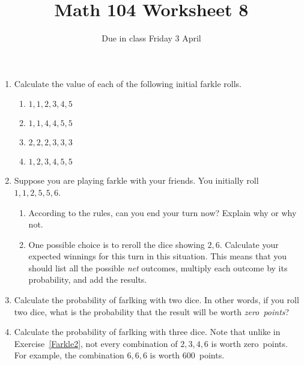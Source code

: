 \documentclass[12pt]{article}
\author{}\date{Due in class Friday 3 April}
\title{Math 104 Worksheet 8}\author{}
\begin{document}
\maketitle
\thispagestyle{empty}
\begin{enumerate}
\item Calculate the value of each of the following
initial farkle rolls.
\begin{enumerate}
\item $1,1,2,3,4,5$
\item $1,1,4,4,5,5$
\item $2,2,2,3,3,3$
\item $1,2,3,4,5,5$
\end{enumerate}

\item Suppose you are playing farkle with your
friends. You initially roll $1,1,2,5,5,6$.
\begin{enumerate}
\item According to the rules, can you end your turn now?
Explain why or why not.
\vspace{1cm}
\item One possible choice is to reroll the dice showing $2,6$.
Calculate your expected winnings for this turn in
this situation.
This means that you should list all the possible {\em net}
outcomes, multiply each outcome by its probability,
and add the results.
\vspace{3cm}
\end{enumerate}

\item\label{Farkle2}
Calculate the probability of farlking with two dice.
In other words, if you roll two dice,
what is the probability that the result will be
worth {\em zero~points}?
\vspace{1in}
\item Calculate the probability of farlking with three dice.
Note that unlike in Exercise~\ref{Farkle2},
not every combination
of $2,3,4,6$ is worth zero~points. For example, the
combination $6,6,6$ is worth 600~points.
\end{enumerate}
\end{document}
